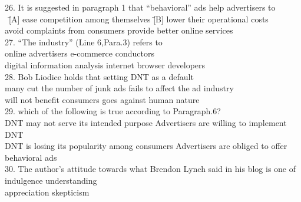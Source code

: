 \begin{tabbing}
26. It is suggested in paragraph 1 that ``behavioral'' ads help advertisers to\\
\hspace{0cm}\ \= [A] ease competition among themselves \quad\quad\quad\quad\quad\= [B] lower their operational costs\\
\> [C] avoid complaints from consumers
\> [D] provide better online services\\

27. ``The industry'' (Line 6,Para.3) refers to\\
\> [A] online advertisers
\> [B] e-commerce conductors\\
\> [C] digital information analysis
\> [D] internet browser developers\\

28. Bob Liodice holds that setting DNT as a default\\
\> [A] many cut the number of junk ads
\> [B] fails to affect the ad industry\\
\> [C] will not benefit consumers
\> [D] goes against human nature\\

29. which of the following is true according to Paragraph.6?\\
\> [A] DNT may not serve its intended purpose
\> [B] Advertisers are willing to implement DNT\\
\> [C] DNT is losing its popularity among consumers
\> [D] Advertisers are obliged to offer behavioral ads\\

30. The author's attitude towards what Brendon Lynch said in his blog is one of\\
\> [A] indulgence
\> [B] understanding\\
\> [C] appreciation
\> [D] skepticism
\end{tabbing}